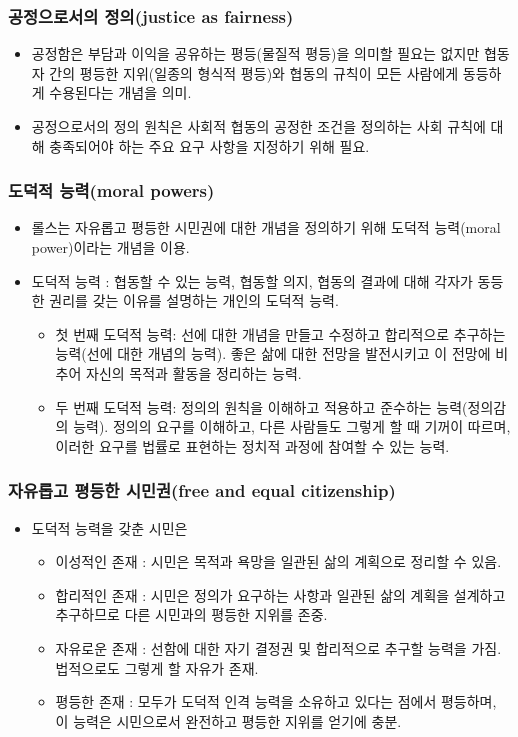 \documentclass[aspectratio=169,xcolor=dvipsnames,handout]{beamer}
\begin{document}
\begin{frame}[<+->]
\frametitle{공정으로서의 정의(justice as fairness)}
    \begin{itemize}
        \item 공정함은 부담과 이익을 공유하는 평등(물질적 평등)을 의미할 필요는 없지만 협동자 간의 평등한 지위(일종의 형식적 평등)와 협동의 규칙이 모든 사람에게 동등하게 수용된다는 개념을 의미.
        \item 공정으로서의 정의 원칙은 사회적 협동의 공정한 조건을 정의하는 사회 규칙에 대해 충족되어야 하는 주요 요구 사항을 지정하기 위해 필요.
    \end{itemize}
\end{frame}

\begin{frame}[<+->]
\frametitle{도덕적 능력(moral powers)}
    \begin{itemize}
        \item 롤스는 자유롭고 평등한 시민권에 대한 개념을 정의하기 위해 도덕적 능력(moral power)이라는 개념을 이용.
        \item 도덕적 능력 : 협동할 수 있는 능력, 협동할 의지, 협동의 결과에 대해 각자가 동등한 권리를 갖는 이유를 설명하는 개인의 도덕적 능력.
        \begin{itemize}
            \item  첫 번째 도덕적 능력: 선에 대한 개념을 만들고 수정하고 합리적으로 추구하는 능력(선에 대한 개념의 능력). 좋은 삶에 대한 전망을 발전시키고 이 전망에 비추어 자신의 목적과 활동을 정리하는 능력.
            \item  두 번째 도덕적 능력: 정의의 원칙을 이해하고 적용하고 준수하는 능력(정의감의 능력). 정의의 요구를 이해하고, 다른 사람들도 그렇게 할 때 기꺼이 따르며, 이러한 요구를 법률로 표현하는 정치적 과정에 참여할 수 있는 능력.
        \end{itemize}
    \end{itemize}
\end{frame}

\begin{frame}[<+->]
\frametitle{자유롭고 평등한 시민권(free and equal citizenship)}
    \begin{itemize}
        \item 도덕적 능력을 갖춘 시민은 
        \begin{itemize}
            \item 이성적인 존재 : 시민은 목적과 욕망을 일관된 삶의 계획으로 정리할 수 있음. 
            \item 합리적인 존재 : 시민은 정의가 요구하는 사항과 일관된 삶의 계획을 설계하고 추구하므로 다른 시민과의 평등한 지위를 존중.
            \item 자유로운 존재 : 선함에 대한 자기 결정권 및 합리적으로 추구할 능력을 가짐. 법적으로도 그렇게 할 자유가 존재.
            \item 평등한 존재 : 모두가 도덕적 인격 능력을 소유하고 있다는 점에서 평등하며, 이 능력은 시민으로서 완전하고 평등한 지위를 얻기에 충분.
        \end{itemize}
    \end{itemize}
\end{frame}
\end{document}
